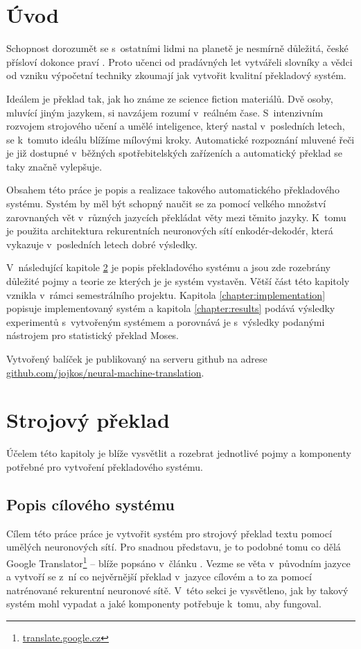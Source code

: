 \chapter{Úvod}
Schopnost dorozumět se s~ostatními lidmi na planetě je nesmírně důležitá, české přísloví dokonce praví . Proto učenci od pradávných let vytvářeli slovníky a vědci od vzniku výpočetní techniky zkoumají jak vytvořit kvalitní překladový systém.

Ideálem je překlad tak, jak ho známe ze science fiction materiálů. Dvě osoby, mluvící jiným jazykem, si navzájem rozumí v~reálném čase. S~intenzivním rozvojem strojového učení a umělé inteligence, který nastal v~posledních letech, se k~tomuto ideálu blížíme mílovými kroky. Automatické rozpoznání mluvené řeči je již dostupné v~běžných spotřebitelských zařízeních a automatický překlad se taky značně vylepšuje.

Obsahem této práce je popis a realizace takového automatického překladového systému. Systém by měl být schopný naučit se za pomocí velkého množství zarovnaných vět v~různých jazycích překládat věty mezi těmito jazyky. K~tomu je použita architektura rekurentních neuronových sítí enkodér-dekodér, která vykazuje v~posledních letech dobré výsledky.

V~následující kapitole \ref{chapter:theory} je popis překladového systému a jsou zde rozebrány důležité pojmy a teorie ze kterých je je systém vystavěn. Větší část této kapitoly vznikla v~rámci semestrálního projektu. Kapitola \ref{chapter:implementation} popisuje implementovaný systém a kapitola \ref{chapter:results} podává výsledky experimentů s~vytvořeným systémem a porovnává je s~výsledky podanými nástrojem pro statistický překlad Moses.

Vytvořený balíček je publikovaný na serveru github na adrese \url{github.com/jojkos/neural-machine-translation}.


\chapter{Strojový překlad}\label{chapter:theory}
Účelem této kapitoly je blíže vysvětlit a rozebrat jednotlivé pojmy a komponenty potřebné pro vytvoření překladového systému.

\section{Popis cílového systému} \label{chapter:draft}
Cílem této práce práce je vytvořit systém pro strojový překlad textu pomocí umělých neuronových sítí. Pro snadnou představu, je to podobné tomu co dělá Google Translator\footnote{\url{translate.google.cz}} -- blíže popsáno v~článku \cite{googleBridgingGap}. Vezme se věta v~původním jazyce a vytvoří se z~ní co nejvěrnější překlad v~jazyce cílovém a to za pomocí natrénované rekurentní neuronové sítě. V~této sekci je vysvětleno, jak by takový systém mohl vypadat a jaké komponenty potřebuje k~tomu, aby fungoval.

